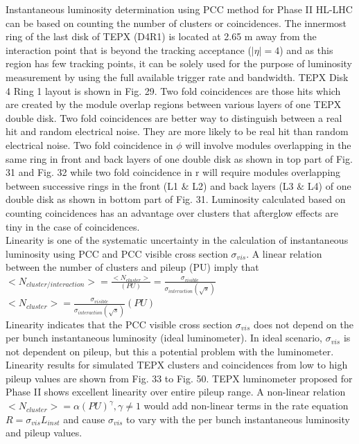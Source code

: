 Instantaneous luminosity determination using PCC method for Phase II HL-LHC can be based on counting the number of clusters or coincidences. The innermost ring of the last disk of TEPX (D4R1) is located at 2.65 m away from the interaction point that is beyond the tracking acceptance ($|\eta| = 4$) and as this region has few tracking points, it can be solely used for the purpose of luminosity measurement by using the full available trigger rate and bandwidth. TEPX Disk 4 Ring 1 layout is shown in Fig. 29. Two fold coincidences are those hits which are created by the module overlap regions between various layers of one TEPX double disk. Two fold coincidences are better way to distinguish between a real hit and random electrical noise. They are more likely to be real hit than random electrical noise. Two fold coincidence in $\phi$ will involve modules overlapping in the same ring in front and back layers of one double disk as shown in top part of Fig. 31 and Fig. 32 while two fold coincidence in r will require modules overlapping between successive rings in the front (L1 $\&$ L2) and back layers (L3 $\&$ L4) of one double disk as shown in bottom part of Fig. 31. Luminosity calculated based on counting coincidences has an advantage over clusters that afterglow effects are tiny in the case of coincidences.  \cite{Collaboration:2706512} \\


Linearity is one of the systematic uncertainty in the calculation of instantaneous luminosity using PCC and PCC visible cross section $\sigma_{vis}$. A linear relation between the number of clusters and pileup (PU) imply that \\

$<N_{cluster/interaction}> = \frac{<N_{cluster}>}{(PU)} = \frac{\sigma_{visible}}{\sigma_{interaction} (\sqrt{s})}$ \\

$<N_{cluster}> =  \frac{\sigma_{visible}}{\sigma_{interaction}(\sqrt{s})} (PU)$ \\

\newpage Linearity indicates that the PCC visible cross section $\sigma_{vis}$ does not depend on the per bunch instantaneous luminosity (ideal luminometer). In ideal scenario, $\sigma_{vis}$ is not dependent on pileup, but this a potential problem with the luminometer. Linearity results for simulated TEPX clusters and coincidences from low to high pileup values are shown from Fig. 33 to Fig. 50. TEPX luminometer proposed for Phase II shows excellent linearity over entire pileup range. A non-linear relation $<N_{cluster}> = \alpha (PU)^{\gamma}, \gamma \neq 1$ would add non-linear terms in the rate equation $R = \sigma_{vis} L_{inst}$  and cause $\sigma_{vis}$ to vary with the per bunch instantaneous luminosity and pileup values.


